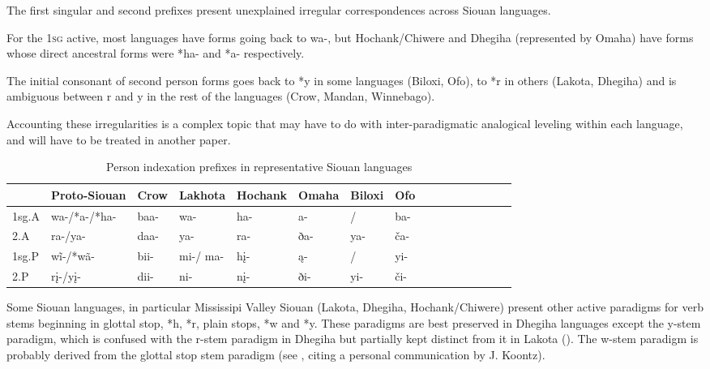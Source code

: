 \documentclass[oneside,a4paper,11pt]{article}
\newcommand{\ipa}[1]{{\phon#1}} %
\begin{document}
The first singular and second prefixes present unexplained irregular correspondences across Siouan languages. 

For the \textsc{1sg} active, most languages have forms going back to \ipa{*wa-}, but Hochank/Chiwere and Dhegiha (represented by Omaha) have forms whose direct ancestral forms were *\ipa{ha-} and *\ipa{a-} respectively. 

The initial consonant of second person forms goes back to *\ipa{y} in some languages (Biloxi, Ofo), to *\ipa{r} in others (Lakota, Dhegiha) and is ambiguous between \ipa{*r} and \ipa{*y} in the rest of the languages (Crow, Mandan, Winnebago).

Accounting these irregularities is a complex topic that may have to do with inter-paradigmatic analogical leveling within each language, and will have to be treated in another paper.

\begin{table}[H]
\caption{Person indexation prefixes in representative Siouan languages} \label{tab:siouan}
\begin{tabular}{llllllllllllllll}
\toprule
 & 	Proto-Siouan & 	Crow & 	Lakhota & 	Hochank & 	Omaha & 	Biloxi & 	Ofo & 	\\
 \midrule
1sg.A & 	\ipa{*wa-/*a-/*ha-} & 	\ipa{baa-} & 	\ipa{wa-} & 	\ipa{ha-} & 	\ipa{a-} & 	\ipa{/} & 	\ipa{ba-} & 	\\
2.A & 	\ipa{*ra-/ya-} & 	\ipa{daa-} & 	\ipa{ya-} & 	\ipa{ra-} & 	\ipa{ða-} & 	\ipa{ya-} & 	\ipa{ča- } & 	\\
1sg.P & 	\ipa{*wĩ-/*wã-} & 	\ipa{bii-} & 	\ipa{mi-/
ma-} & 	\ipa{hį-} & 	\ipa{ą-} & 	\ipa{/} & 	\ipa{yi-} & 	\\
2.P & 	\ipa{*rį-/yį-} & 	\ipa{dii-} & 	\ipa{ni-} & 	\ipa{nį-} & 	\ipa{ði-} & 	\ipa{yi-} & 	\ipa{či-} & 	\\
\bottomrule
\end{tabular}
\end{table}

Some Siouan languages, in particular Mississipi Valley Siouan (Lakota, Dhegiha, Hochank/Chiwere) present other active paradigms for verb stems beginning in glottal stop, *\ipa{h}, *\ipa{r}, plain stops, *\ipa{w} and *\ipa{y}. These paradigms are best preserved in Dhegiha languages except the y-stem paradigm, which is confused with the r-stem paradigm in Dhegiha but partially kept distinct from it in Lakota (\citealt{jacques16ebde}). The w-stem paradigm is probably derived from the glottal stop stem paradigm (see \citealt[496]{rankin05quapaw}, citing a personal communication by J. Koontz).
\end{document}
